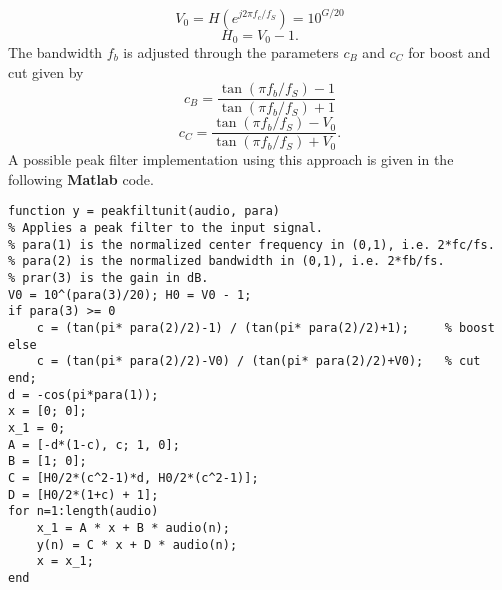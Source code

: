 \documentclass[10pt,a4paper,oneside]{article}
\begin{document}
\[
V_0 = H(e^{j2\pi f_c/f_S}) = 10^{G/20}
\]
\[
H_0 = V_0 - 1.
\]
The bandwidth $f_b$ is adjusted through the parameters $c_B$ and $c_C$ for boost and cut given by
\[
c_B = \frac{\tan(\pi f_b/f_S) - 1}{\tan(\pi f_b/f_S) + 1}
\]
\[
c_C = \frac{\tan(\pi f_b/f_S) - V_0}{\tan(\pi f_b/f_S) + V_0}.
\]
A possible peak filter implementation using this approach is given in the following {\bfseries Matlab} code.
\begin{lstlisting}
function y = peakfiltunit(audio, para)
% Applies a peak filter to the input signal.
% para(1) is the normalized center frequency in (0,1), i.e. 2*fc/fs.
% para(2) is the normalized bandwidth in (0,1), i.e. 2*fb/fs.
% prar(3) is the gain in dB.
V0 = 10^(para(3)/20); H0 = V0 - 1;
if para(3) >= 0
	c = (tan(pi* para(2)/2)-1) / (tan(pi* para(2)/2)+1);     % boost
else
	c = (tan(pi* para(2)/2)-V0) / (tan(pi* para(2)/2)+V0);   % cut
end;
d = -cos(pi*para(1));
x = [0; 0];
x_1 = 0;
A = [-d*(1-c), c; 1, 0];
B = [1; 0];
C = [H0/2*(c^2-1)*d, H0/2*(c^2-1)];
D = [H0/2*(1+c) + 1];
for n=1:length(audio)
	x_1 = A * x + B * audio(n);
	y(n) = C * x + D * audio(n);
	x = x_1;
end
\end{lstlisting}
\end{document}
